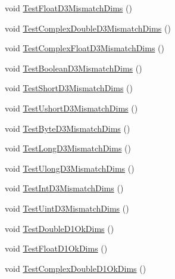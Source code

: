 \begin{DoxyCompactItemize}
\item 
void \mbox{\hyperlink{classkhiva_1_1array_1_1tests_1_1_array_tests_ae8b16bf7e2a8c6db8d2e45d6abdbdfe8}{Test\+Float\+D3\+Mismatch\+Dims}} ()
\item 
void \mbox{\hyperlink{classkhiva_1_1array_1_1tests_1_1_array_tests_afaadc18fca5abb32d4577b9bf0a32a30}{Test\+Complex\+Double\+D3\+Mismatch\+Dims}} ()
\item 
void \mbox{\hyperlink{classkhiva_1_1array_1_1tests_1_1_array_tests_a2910c349829e73d421314899dac8a9de}{Test\+Complex\+Float\+D3\+Mismatch\+Dims}} ()
\item 
void \mbox{\hyperlink{classkhiva_1_1array_1_1tests_1_1_array_tests_afa75558eed03ecf479b7eac8892b2101}{Test\+Boolean\+D3\+Mismatch\+Dims}} ()
\item 
void \mbox{\hyperlink{classkhiva_1_1array_1_1tests_1_1_array_tests_aa3c3b31b6f7e65373057b67e06254d51}{Test\+Short\+D3\+Mismatch\+Dims}} ()
\item 
void \mbox{\hyperlink{classkhiva_1_1array_1_1tests_1_1_array_tests_afe74a75dbc7110471860bf54f9ab66df}{Test\+Ushort\+D3\+Mismatch\+Dims}} ()
\item 
void \mbox{\hyperlink{classkhiva_1_1array_1_1tests_1_1_array_tests_a047a0fe28303a7ca828e5f6d70367591}{Test\+Byte\+D3\+Mismatch\+Dims}} ()
\item 
void \mbox{\hyperlink{classkhiva_1_1array_1_1tests_1_1_array_tests_a27ee2a07f686ec1ae343dad6099b5554}{Test\+Long\+D3\+Mismatch\+Dims}} ()
\item 
void \mbox{\hyperlink{classkhiva_1_1array_1_1tests_1_1_array_tests_ae5f1f516b01dfce42af4c48664076f7c}{Test\+Ulong\+D3\+Mismatch\+Dims}} ()
\item 
void \mbox{\hyperlink{classkhiva_1_1array_1_1tests_1_1_array_tests_a1008ae5273cb19804e0ffcff7e200a73}{Test\+Int\+D3\+Mismatch\+Dims}} ()
\item 
void \mbox{\hyperlink{classkhiva_1_1array_1_1tests_1_1_array_tests_aae587ac9497a88318ca3aef37a4d5baf}{Test\+Uint\+D3\+Mismatch\+Dims}} ()
\item 
void \mbox{\hyperlink{classkhiva_1_1array_1_1tests_1_1_array_tests_a62519a28c791d4bc65dde90bb7743554}{Test\+Double\+D1\+Ok\+Dims}} ()
\item 
void \mbox{\hyperlink{classkhiva_1_1array_1_1tests_1_1_array_tests_adb6a78f1bed2551c832fe1db24e73bd9}{Test\+Float\+D1\+Ok\+Dims}} ()
\item 
void \mbox{\hyperlink{classkhiva_1_1array_1_1tests_1_1_array_tests_a2157c8821b637346db1c11c7dad5952f}{Test\+Complex\+Double\+D1\+Ok\+Dims}} ()

\end{DoxyCompactItemize}
